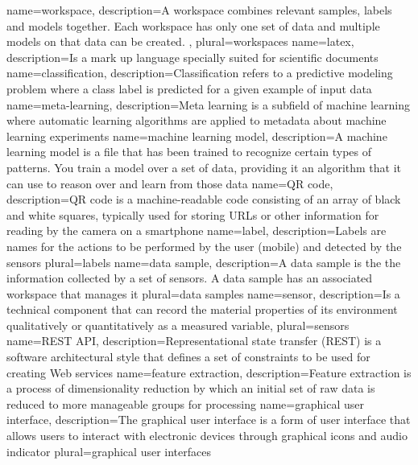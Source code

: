 {
    name={workspace},
    description={A workspace combines relevant samples, labels and models together. Each workspace has only one set of data and multiple models on that data can be created.
    },
    plural={workspaces}
}
{
    name={latex},
    description={Is a mark up language specially suited for scientific documents}
}
{
    name={classification},
    description={Classification refers to a predictive modeling problem where a class \gls{label} is predicted for a given example of input data}
}
{
    name={meta-learning},
    description={Meta learning is a subfield of machine learning where automatic learning algorithms are applied to metadata about machine learning experiments}
}
{
    name={machine learning model},
    description={A machine learning model is a file that has been trained to recognize certain types of patterns. You train a model over a set of data, providing it an algorithm that it can use to reason over and learn from those data}
}
{
    name={QR code},
    description={QR code is a machine-readable code consisting of an array of black and white squares, typically used for storing URLs or other information for reading by the camera on a smartphone}
}
{
    name={label},
    description={Labels are names for the actions to be performed by the user (mobile) and detected by the sensors}
    plural={labels}
}
{
    name={data sample},
    description={A data sample is the the information collected by a set of sensors. A data sample has an associated \gls{workspace} that manages it}
    plural={data samples}
}
{
    name={sensor},
    description={Is a technical component that can record the material properties of its environment qualitatively or quantitatively as a measured variable},
    plural={sensors}
}
{
    name={REST API},
    description={Representational state transfer (REST) is a software architectural style that defines a set of constraints to be used for creating Web services}
}
{
    name={feature extraction},
    description={Feature extraction is a process of dimensionality reduction by which an initial set of raw data is reduced to more manageable groups for processing}
}
{
    name={graphical user interface},
    description={The graphical user interface is a form of user interface that allows users to interact with electronic devices through graphical icons and audio indicator}
    plural={graphical user interfaces}
}
